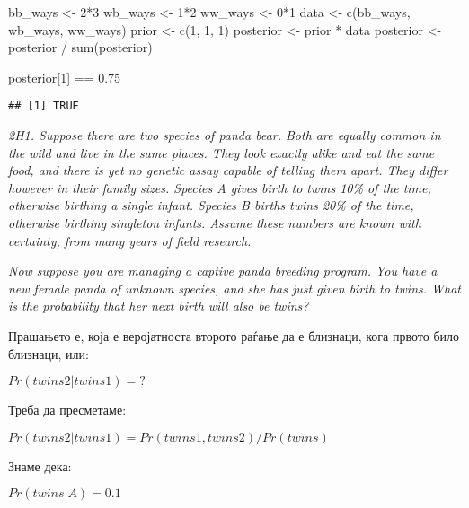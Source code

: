 \documentclass[
]{book}
\newenvironment{Shaded}{\begin{snugshade}}{\end{snugshade}}
\newcommand{\DecValTok}[1]{\textcolor[rgb]{0.00,0.00,0.81}{#1}}
\newcommand{\FloatTok}[1]{\textcolor[rgb]{0.00,0.00,0.81}{#1}}
\newcommand{\FunctionTok}[1]{\textcolor[rgb]{0.00,0.00,0.00}{#1}}
\newcommand{\NormalTok}[1]{#1}
\newcommand{\OtherTok}[1]{\textcolor[rgb]{0.56,0.35,0.01}{#1}}
\newcommand{\SpecialCharTok}[1]{\textcolor[rgb]{0.00,0.00,0.00}{#1}}
\begin{document}
\begin{Shaded}
\begin{Highlighting}[]
\NormalTok{bb\_ways }\OtherTok{\textless{}{-}} \DecValTok{2}\SpecialCharTok{*}\DecValTok{3}
\NormalTok{wb\_ways }\OtherTok{\textless{}{-}} \DecValTok{1}\SpecialCharTok{*}\DecValTok{2}
\NormalTok{ww\_ways }\OtherTok{\textless{}{-}} \DecValTok{0}\SpecialCharTok{*}\DecValTok{1}
\NormalTok{data }\OtherTok{\textless{}{-}} \FunctionTok{c}\NormalTok{(bb\_ways, wb\_ways, ww\_ways)}
\NormalTok{prior }\OtherTok{\textless{}{-}} \FunctionTok{c}\NormalTok{(}\DecValTok{1}\NormalTok{, }\DecValTok{1}\NormalTok{, }\DecValTok{1}\NormalTok{)}
\NormalTok{posterior }\OtherTok{\textless{}{-}}\NormalTok{ prior }\SpecialCharTok{*}\NormalTok{ data}
\NormalTok{posterior }\OtherTok{\textless{}{-}}\NormalTok{ posterior }\SpecialCharTok{/} \FunctionTok{sum}\NormalTok{(posterior)}

\NormalTok{posterior[}\DecValTok{1}\NormalTok{] }\SpecialCharTok{==} \FloatTok{0.75}
\end{Highlighting}
\end{Shaded}

\begin{verbatim}
## [1] TRUE
\end{verbatim}

\emph{2H1. Suppose there are two species of panda bear. Both are equally common in the wild and live in the same places. They look exactly alike and eat the same food, and there is yet no genetic assay capable of telling them apart. They differ however in their family sizes. Species A gives birth to twins 10\% of the time, otherwise birthing a single infant. Species B births twins 20\% of the time, otherwise birthing singleton infants. Assume these numbers are known with certainty, from many years of field research.}

\emph{Now suppose you are managing a captive panda breeding program. You have a new female panda of unknown species, and she has just given birth to twins. What is the probability that her next birth will also be twins?}

Прашањето е, која е веројатноста второто раѓање да е близнаци, кога првото било близнаци, или:

\(Pr(twins2|twins1) = ?\)

Треба да пресметаме:

\(Pr(twins2|twins1) = Pr(twins1, twins2) / Pr(twins)\)

Знаме дека:

\(Pr(twins|A) = 0.1\)
\end{document}
